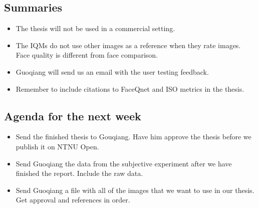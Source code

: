 \subsection*{Summaries}
\begin{itemize}
    \item The thesis will not be used in a commercial setting.
    \item The IQMs do not use other images as a reference when they rate images. Face quality is different from face comparison. 
    \item Guoqiang will send us an email with the user testing feedback.
    \item Remember to include citations to FaceQnet and ISO metrics in the thesis.
\end{itemize}

\subsection*{Agenda for the next week}
\begin{itemize}
    \item Send the finished thesis to Gouqiang. Have him approve the thesis before we publish it on NTNU Open.
    \item Send Guoqiang the data from the subjective experiment after we have finished the report. Include the raw data.
    \item Send Guoqiang a file with all of the images that we want to use in our thesis. Get approval and references in order.
\end{itemize}
